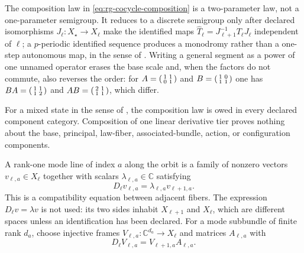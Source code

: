 The composition law in \eqref{eq:rg-cocycle-composition} is a two-parameter law,
not a one-parameter semigroup. It reduces to a discrete semigroup only after
declared isomorphisms \(J_\ell:X_\star\to X_\ell\) make the identified maps
\(\widehat T_\ell=J_{\ell+1}^{-1}T_\ell J_\ell\) independent of \(\ell\); a
\(p\)-periodic identified sequence produces a monodromy rather than a one-step
autonomous map, in the sense of . Writing a general
segment as a power of one unnamed operator erases the base scale and, when the
factors do not commute, also reverses the order: for
\(A=\begin{psmallmatrix}1&1\\0&1\end{psmallmatrix}\) and
\(B=\begin{psmallmatrix}1&0\\1&1\end{psmallmatrix}\) one has
\(BA=\begin{psmallmatrix}1&1\\1&2\end{psmallmatrix}\) and
\(AB=\begin{psmallmatrix}2&1\\1&1\end{psmallmatrix}\), which differ.

For a mixed state in the sense of , the composition
law is owed in every declared component category. Composition of one linear
derivative tier proves nothing about the base, principal, law-fiber,
associated-bundle, action, or configuration components. 

A rank-one mode line of index \(a\) along the orbit is a family of nonzero
vectors \(v_{\ell,a}\in X_\ell\) together with scalars
\(\lambda_{\ell,a}\in\mathbb C\) satisfying
\begin{equation}
D_\ell v_{\ell,a}=\lambda_{\ell,a}v_{\ell+1,a}.
\label{eq:rg-mode-line}
\end{equation}
This is a compatibility equation between adjacent fibers. The expression
\(D_\ell v=\lambda v\) is not used: its two sides inhabit \(X_{\ell+1}\) and
\(X_\ell\), which are different spaces unless an identification has been
declared. For a mode subbundle of finite rank \(d_a\), choose injective frames
\(V_{\ell,a}:\mathbb C^{d_a}\to X_\ell\) and matrices \(A_{\ell,a}\) with
\begin{equation}
D_\ell V_{\ell,a}=V_{\ell+1,a}A_{\ell,a}.
\label{eq:rg-mode-frame}
\end{equation}

